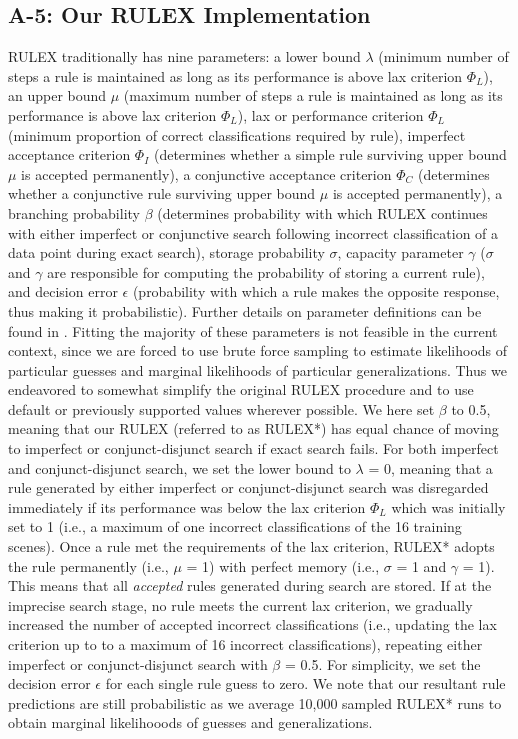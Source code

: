 \documentclass[doc,natbib,floatsintext]{apa7}
\begin{document}
\begin{appendices}
\subsection{A-5: Our RULEX Implementation}\label{ap:a5_rulex_details}
RULEX traditionally has nine parameters: a lower bound $\lambda$ (minimum number of steps a rule is maintained as long as its performance is above lax criterion $\Phi_L$), an upper bound $\mu$ (maximum number of steps a rule is maintained as long as its performance is above lax criterion $\Phi_L$), lax or performance criterion $\Phi_L$ (minimum proportion of correct classifications required by rule), imperfect acceptance criterion $\Phi_I$ (determines whether a simple rule surviving upper bound $\mu$ is accepted permanently), a conjunctive acceptance criterion $\Phi_C$ (determines whether a conjunctive rule surviving upper bound $\mu$ is accepted permanently), a branching probability $\beta$ (determines probability with which RULEX continues with either imperfect or conjunctive search following incorrect classification of a data point during exact search), storage probability $\sigma$, capacity parameter $\gamma$ ($\sigma$ and $\gamma$ are responsible for computing the probability of storing a current rule), and decision error $\epsilon$ (probability with which a rule makes the opposite response, thus making it probabilistic). Further details on parameter definitions can be found in \cite{navarro2005analyzing}. Fitting the majority of these parameters is not feasible in the current context, since we are forced to use brute force sampling to estimate likelihoods of particular guesses and marginal likelihoods of particular generalizations. Thus we endeavored to somewhat simplify the original RULEX procedure and to use default or previously supported values wherever possible. We here set $\beta$ to 0.5, meaning that our RULEX (referred to as RULEX*) has equal chance of moving to imperfect or conjunct-disjunct search if exact search fails. For both imperfect and conjunct-disjunct search, we set the lower bound to $\lambda$ = 0, meaning that a rule generated by either imperfect or conjunct-disjunct search was disregarded immediately if its performance was below the lax criterion $\Phi_L$ which was initially set to 1 (i.e., a maximum of one incorrect classifications of the 16 training scenes). Once a rule met the requirements of the lax criterion, RULEX* adopts the rule permanently (i.e., $\mu$ = 1) with perfect memory (i.e., $\sigma$ = 1 and $\gamma$ = 1). This means that all \textit{accepted} rules generated during search are stored. If at the imprecise search stage, no rule meets the current lax criterion, we gradually increased the number of accepted incorrect classifications (i.e., updating the lax criterion up to to a maximum of 16 incorrect classifications), repeating either imperfect or conjunct-disjunct search with $\beta$ = 0.5. For simplicity, we set the decision error $\epsilon$ for each single rule guess to zero. We note that our resultant rule predictions are still probabilistic as we average 10,000 sampled RULEX* runs to obtain marginal likelihooods of guesses and generalizations.



\end{appendices}
\end{document}
